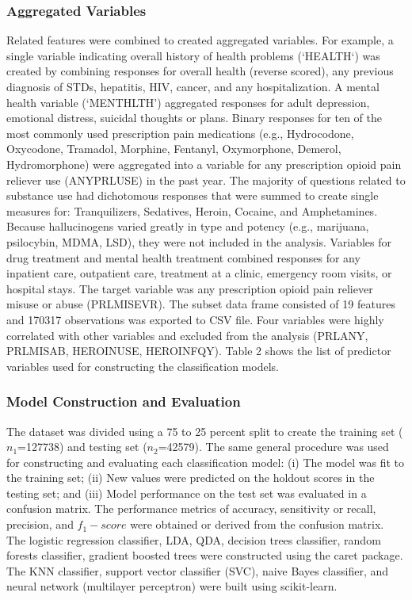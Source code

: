 \documentclass[sigconf]{acmart}
\begin{document}
\subsubsection{Aggregated Variables}

Related features were combined to created aggregated variables. For example, 
a single variable indicating overall history of health problems (`HEALTH`) 
was created by combining responses for overall health (reverse scored), any
previous diagnosis of STDs, hepatitis, HIV, cancer, and any hospitalization. 
A mental health variable (`MENTHLTH') aggregated responses for adult depression, 
emotional distress, suicidal thoughts or plans. Binary responses for ten of 
the most commonly used prescription pain medications (e.g., Hydrocodone, 
Oxycodone, Tramadol, Morphine, Fentanyl, Oxymorphone, Demerol, Hydromorphone) 
were aggregated into a variable for any prescription opioid pain reliever use 
(ANYPRLUSE) in the past year. The majority of questions related to substance 
use had dichotomous responses that were summed to create single measures for: 
Tranquilizers, Sedatives, Heroin, Cocaine, and Amphetamines. Because 
hallucinogens varied greatly in type and potency (e.g., marijuana, psilocybin, 
MDMA, LSD), they were not included in the analysis. Variables for drug 
treatment and mental health treatment combined responses for any inpatient 
care, outpatient care, treatment at a clinic, emergency room visits, or 
hospital stays. The target variable was any prescription opioid pain reliever 
misuse or abuse (PRLMISEVR). The subset data frame consisted of 19 features 
and 170317 observations was exported to CSV file. Four variables were highly 
correlated with other variables and excluded from the analysis (PRLANY, PRLMISAB, 
HEROINUSE, HEROINFQY). Table 2 shows the list of predictor variables used for 
constructing the classification models. 


\subsubsection{Model Construction and Evaluation}

The dataset was divided using a 75 to 25 percent split to create the training 
set ($n_1$=127738) and testing set ($n_2$=42579). The same general procedure 
was used for constructing and evaluating each classification model: (i) The 
model was fit to the training set; (ii) New values were predicted on the 
holdout scores in the testing set; and (iii) Model performance on the test 
set was evaluated in a confusion matrix. The performance metrics of accuracy, 
sensitivity or recall, precision, and $f_1-score$ were obtained or derived 
from the confusion matrix. The logistic regression classifier, LDA, QDA, 
decision trees classifier, random forests classifier, gradient boosted trees 
were constructed using the caret package. The KNN classifier, support 
vector classifier (SVC), naive Bayes classifier, and neural network 
(multilayer perceptron) were built using scikit-learn. 
\end{document}
